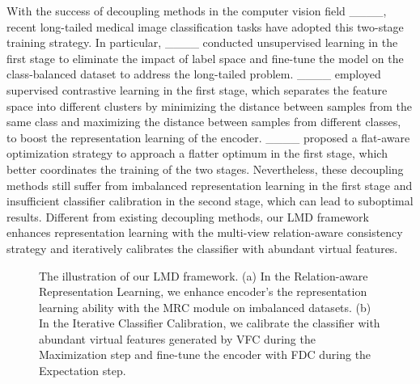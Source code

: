 With the success of decoupling methods in the computer vision field ____, recent long-tailed medical image classification tasks have adopted this two-stage training strategy.
In particular, ____ conducted unsupervised learning in the first stage to eliminate the impact of label space and fine-tune the model on the class-balanced dataset to address the long-tailed problem.
____ employed supervised contrastive learning in the first stage, which separates the feature space into different clusters by minimizing the distance between samples from the same class and maximizing the distance between samples from different classes, to boost the representation learning of the encoder.
____ proposed a flat-aware optimization strategy to approach a flatter optimum in the first stage, which better coordinates the training of the two stages. Nevertheless, these decoupling methods still suffer from imbalanced representation learning in the first stage and insufficient classifier calibration in the second stage, which can lead to suboptimal results. Different from existing decoupling methods, our LMD framework enhances representation learning with the multi-view relation-aware consistency strategy and iteratively calibrates the classifier with abundant virtual features.

\begin{figure*}[t]
\centering
{}
\caption{The illustration of our LMD framework. (a) In the Relation-aware Representation Learning, we enhance encoder's the representation learning ability with the MRC module on imbalanced datasets. (b) In the Iterative Classifier Calibration, we calibrate the classifier with abundant virtual features generated by VFC during the Maximization step and fine-tune the encoder with FDC during the Expectation step.} \label{fig:framework}
\end{figure*}